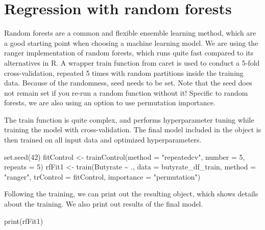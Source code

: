 \documentclass[
  oneside]{book}
\newenvironment{Shaded}{\begin{snugshade}}{\end{snugshade}}
\newcommand{\AttributeTok}[1]{\textcolor[rgb]{0.77,0.63,0.00}{#1}}
\newcommand{\DecValTok}[1]{\textcolor[rgb]{0.00,0.00,0.81}{#1}}
\newcommand{\FunctionTok}[1]{\textcolor[rgb]{0.00,0.00,0.00}{#1}}
\newcommand{\NormalTok}[1]{#1}
\newcommand{\OtherTok}[1]{\textcolor[rgb]{0.56,0.35,0.01}{#1}}
\newcommand{\SpecialCharTok}[1]{\textcolor[rgb]{0.00,0.00,0.00}{#1}}
\newcommand{\StringTok}[1]{\textcolor[rgb]{0.31,0.60,0.02}{#1}}
\begin{document}
\hypertarget{regression-with-random-forests}{%
\section{Regression with random forests}\label{regression-with-random-forests}}

Random forests are a common and flexible ensemble learning method, which are a good starting
point when choosing a machine learning model. We are using the ranger implementation
of random forests, which runs quite fast compared to its alternatives in R. A wrapper
train function from caret is used to conduct a 5-fold cross-validation, repeated 5 times
with random partitions inside the training data. Because of the randomness, seed needs
to be set. Note that the seed does not remain set if you re-run a random function
without it! Specific to random forests, we are also using an option to use permutation
importance.

The train function is quite complex, and performs hyperparameter tuning while training the
model with cross-validation. The final model included in the object is then trained on all
input data and optimized hyperparameters.

\begin{Shaded}
\begin{Highlighting}[]
\FunctionTok{set.seed}\NormalTok{(}\DecValTok{42}\NormalTok{)}
\NormalTok{fitControl }\OtherTok{\textless{}{-}} \FunctionTok{trainControl}\NormalTok{(}\AttributeTok{method =} \StringTok{"repeatedcv"}\NormalTok{, }\AttributeTok{number =} \DecValTok{5}\NormalTok{, }\AttributeTok{repeats =} \DecValTok{5}\NormalTok{)}
\NormalTok{rfFit1 }\OtherTok{\textless{}{-}} \FunctionTok{train}\NormalTok{(Butyrate }\SpecialCharTok{\textasciitilde{}}\NormalTok{ ., }\AttributeTok{data =}\NormalTok{ butyrate\_df\_train, }
                \AttributeTok{method =} \StringTok{"ranger"}\NormalTok{, }
                \AttributeTok{trControl =}\NormalTok{ fitControl,}
                \AttributeTok{importance =} \StringTok{"permutation"}\NormalTok{)}
\end{Highlighting}
\end{Shaded}

Following the training, we can print out the resulting object, which shows details about
the training. We also print out results of the final model.

\begin{Shaded}
\begin{Highlighting}[]
\FunctionTok{print}\NormalTok{(rfFit1)}
\end{Highlighting}
\end{Shaded}
\end{document}
